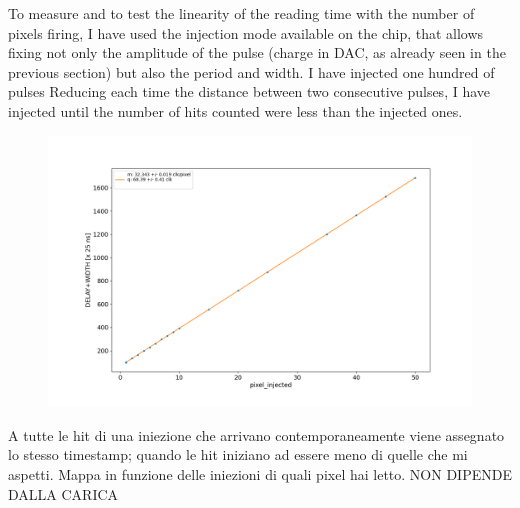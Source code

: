         To measure and to test the linearity of the reading time with the number of pixels firing, I have used the injection mode available on the chip, that allows fixing not only the amplitude of the pulse (charge in DAC, as already seen in the previous section) but also the period and width.
        I have injected one hundred of pulses 
        Reducing each time the distance between two consecutive pulses, I have injected until the number of hits counted were less than the injected ones. 
        

        \begin{figure}[h!]
                \centering
                \includegraphics[width=.7\linewidth]{figures/Monopix1/dead_time.png}
                \caption{}
                \label{fig:dead_time}
            \end{figure}
        A tutte le hit di una iniezione che arrivano contemporaneamente viene assegnato lo stesso timestamp; quando le hit iniziano ad essere meno di quelle che mi aspetti.
        Mappa in funzione delle iniezioni di quali pixel hai letto.
        NON DIPENDE DALLA CARICA
    
